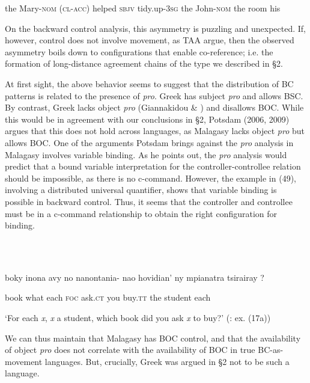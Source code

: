 \documentclass[output=paper]{langsci/langscibook}
\begin{document}
\begin{styleNurTexti}
    the Mary\textsc{{}-nom} (\textsc{cl-acc}) helped \textsc{sbjv} tidy.up\textsc{{}-3sg} the John\textsc{{}-nom} the room     his
\end{styleNurTexti}

\begin{styleNurTexti}
On the backward control analysis, this asymmetry is puzzling and unexpected. If, however, control does not involve movement, as TAA argue, then the observed asymmetry boils down to configurations that enable co-reference; i.e. the formation of long-distance agreement chains of the type we described in §2. 
\end{styleNurTexti}

  At first sight, the above behavior seems to suggest that the distribution of BC patterns is related to the presence of \textit{pro}. Greek has subject \textit{pro} and allows BSC. By contrast, Greek lacks object \textit{pro} (Giannakidou \& \citealt{Merchant1997}) and disallows BOC. While this would be in agreement with our conclusions in §2, Potsdam (2006, 2009) argues that this does not hold across languages, as Malagasy lacks object \textit{pro} but allows BOC. One of the arguments Potsdam brings against the \textit{pro} analysis in Malagasy involves variable binding. As he points out, the \textit{pro} analysis would predict that a bound variable interpretation for the controller-controllee relation should be impossible, as there is no c-command. However, the example in (49), involving a distributed universal quantifier, shows that variable binding is possible in backward control. Thus, it seems that the controller and controllee must be in a c-command relationship to obtain the right configuration for binding. 

\ea%
    \label{ex:key:49}
    \gll\\
        \\
    \glt
    \z

            boky inona avy no nanontania- nao hovidian’ ny mpianatra tsirairay ?

  book what each \textsc{foc}  ask.\textsc{ct}  you buy.\textsc{tt} the student each

‘For each \textit{x}, \textit{x} a student, which book did you ask \textit{x} to buy?’ (\citealt{Potsdam2006}: ex. (17a))

We can thus maintain that Malagasy has BOC control, and that the availability of object \textit{pro} does not correlate with the availability of BOC in true BC-as-movement languages. But, crucially, Greek was argued in §2 not to be such a language.
\end{document}
